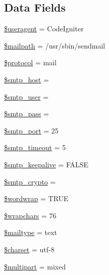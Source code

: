 \subsection*{Data Fields}
\begin{DoxyCompactItemize}
\item 
\hyperlink{class_c_i___email_adc6d59b7c0768eeffafe3b78c4836959}{\$useragent} = \textquotesingle{}Code\+Igniter\textquotesingle{}
\item 
\hyperlink{class_c_i___email_a23dd98b1852b9e73c20292b2cc96b20f}{\$mailpath} = \textquotesingle{}/usr/sbin/sendmail\textquotesingle{}
\item 
\hyperlink{class_c_i___email_ac01bf1cf041487498864d054b991f570}{\$protocol} = \textquotesingle{}mail\textquotesingle{}
\item 
\hyperlink{class_c_i___email_aa1ef5144d9ef39807b72f29299128eb1}{\$smtp\+\_\+host} = \textquotesingle{}\textquotesingle{}
\item 
\hyperlink{class_c_i___email_ac77010332fb55af4ed3ac38f0e39114d}{\$smtp\+\_\+user} = \textquotesingle{}\textquotesingle{}
\item 
\hyperlink{class_c_i___email_ae8b7daa14d7182bd564f04f752948400}{\$smtp\+\_\+pass} = \textquotesingle{}\textquotesingle{}
\item 
\hyperlink{class_c_i___email_af98a134522a65f513cff2718fc74968f}{\$smtp\+\_\+port} = 25
\item 
\hyperlink{class_c_i___email_afd19e9cbfc82dd26a270fccd29e29728}{\$smtp\+\_\+timeout} = 5
\item 
\hyperlink{class_c_i___email_a3ea493da94ea80d0439937af4eab7621}{\$smtp\+\_\+keepalive} = F\+A\+L\+S\+E
\item 
\hyperlink{class_c_i___email_ab324ab40108bacab087e18556627ef1e}{\$smtp\+\_\+crypto} = \textquotesingle{}\textquotesingle{}
\item 
\hyperlink{class_c_i___email_abc150a71df67310da874f7399ab5f2cd}{\$wordwrap} = T\+R\+U\+E
\item 
\hyperlink{class_c_i___email_a8834e27a87a8b935ab1155d1d7bd44d2}{\$wrapchars} = 76
\item 
\hyperlink{class_c_i___email_a7f4dd7af7642585306869f8985ab744f}{\$mailtype} = \textquotesingle{}text\textquotesingle{}
\item 
\hyperlink{class_c_i___email_af10158dd74b75f1d337e83102d6b82ce}{\$charset} = \textquotesingle{}utf-\/8\textquotesingle{}
\item 
\hyperlink{class_c_i___email_adc885f76d89c0c495bea0488f29c3104}{\$multipart} = \textquotesingle{}mixed\textquotesingle{}

\end{DoxyCompactItemize}
